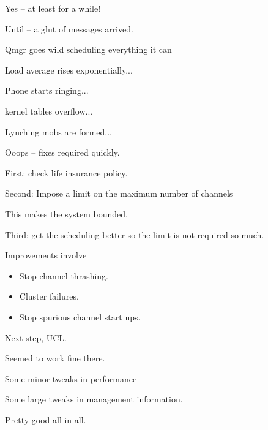 \begin{bwslide}
\begin{nrtc}
\item	Yes -- at least for a while!
\item	Until -- a glut of messages arrived.
\item	Qmgr goes wild scheduling everything it can
\item	Load average rises exponentially...
\item	Phone starts ringing...
\item	kernel tables overflow...
\item	Lynching mobs are formed...
\item	Ooops -- fixes required quickly.
\end{nrtc}
\end{bwslide}

\begin{bwslide}
\begin{nrtc}
\item	First: check life insurance policy.
\item	Second: Impose a limit on the maximum number of channels
\item	This makes the system bounded.
\item	Third: get the scheduling better so the limit is not required
	so much.
\item	Improvements involve
	\begin{itemize}
	\item	Stop channel thrashing.
	\item	Cluster failures.
	\item	Stop spurious channel start ups.
	\end{itemize}
\end{nrtc}
\end{bwslide}

\begin{bwslide}

\begin{nrtc}
\item	Next step, UCL.
\item	Seemed to work fine there.
\item	Some minor tweaks in performance
\item	Some large tweaks in management information.
\item	Pretty good all in all. 
\end{nrtc}
\end{bwslide}

